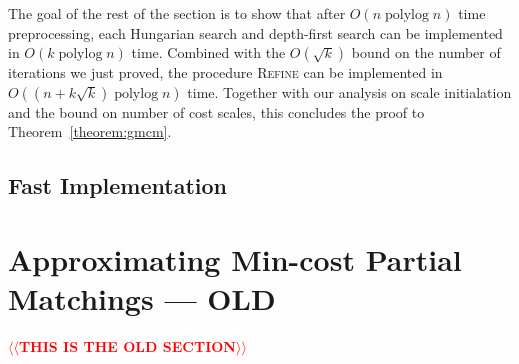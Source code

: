 \documentclass[11pt]{article}
\makeatletter
\def\polylog{\mathop{\mathrm{polylog}}}
\theoremstyle{plain}
\numberwithin{figure}{section}
\def\EMPH#1{\textbf{\boldmath #1}}
\def\n@te#1{\textsf{\boldmath \textbf{$\langle\!\langle$#1$\rangle\!\rangle$}}\leavevmode}
\def\note#1{\textcolor{red}{\n@te{#1}}}
\makeatother
\begin{document}

The goal of the rest of the section is to show that after $O(n \polylog n)$ time preprocessing, each Hungarian search and depth-first search can be implemented in $O(k \polylog n)$ time.
%
Combined with the $O(\sqrt{k})$ bound on the number of iterations we just proved, the procedure \textsc{Refine} can be implemented in $O((n+k\sqrt{k}) \polylog n)$ time.  Together with our analysis on scale initialation and the bound on number of cost scales, this concludes the proof to Theorem~\ref{theorem:gmcm}.




\subsection{Fast Implementation}




\section{Approximating Min-cost Partial Matchings --- OLD}
\label{section:goldberg}

\note{THIS IS THE OLD SECTION}
\end{document}
